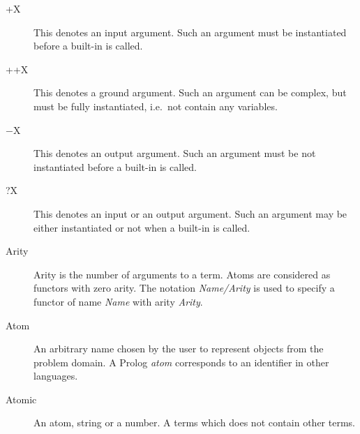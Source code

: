 \begin{description}

\item[+X]
This denotes an input argument. Such an argument must be instantiated before 
a built-in is called.

\item[++X]
This denotes a ground argument. Such an argument can be complex,
but must be fully instantiated, i.e.\ not contain any variables.

\item[$-$X]
This denotes an output argument. Such an argument must be not 
instantiated before a built-in is called.

\item[?X]
This denotes an input or an output argument. Such an argument may be either 
instantiated or not  when a built-in is called.


\item[Arity]	
Arity is the number of arguments to a term.
Atoms are considered as functors with zero arity.
The notation {\it Name/Arity} is used to specify a functor of name 
{\it Name} with arity {\it Arity}.

\item[Atom]
An arbitrary name chosen by the user to represent objects from the 
problem domain.
A Prolog {\it atom} corresponds to an identifier in other languages.

\item[Atomic]
An atom, string or a number. A terms which does not contain other terms.


\end{description}
